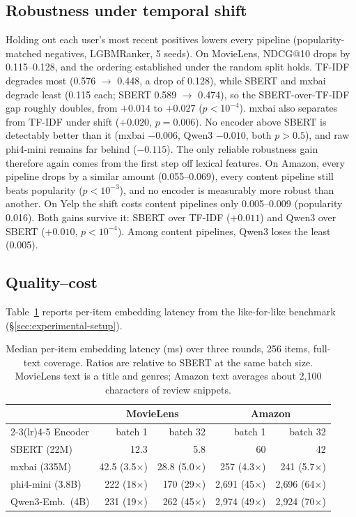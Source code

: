 \subsection{Robustness under temporal shift}
\label{sec:robustness}
\label{tab:robustness}
\label{fig:robustness}
Holding out each user's most recent positives lowers every pipeline
(popularity-matched negatives, LGBMRanker, 5 seeds). On MovieLens, NDCG@10
drops by 0.115--0.128, and the ordering established under the random
split holds. TF-IDF degrades most (0.576 $\rightarrow$ 0.448, a drop of 0.128),
while SBERT and mxbai degrade least (0.115 each; SBERT 0.589
$\rightarrow$ 0.474), so the SBERT-over-TF-IDF gap roughly doubles, from $+0.014$ to $+0.027$ ($p<10^{-4}$). mxbai also separates
from TF-IDF under shift ($+0.020$, $p=0.006$). No encoder above SBERT is
detectably better than it (mxbai $-0.006$, Qwen3 $-0.010$, both
$p>0.5$), and raw phi4-mini remains far behind ($-0.115$). The only
reliable robustness gain therefore again comes from the first step
off lexical features. On Amazon, every pipeline drops by a similar
amount (0.055--0.069), every content pipeline still beats popularity
($p<10^{-3}$), and no encoder is measurably more robust than another.
On Yelp the shift costs content pipelines only 0.005--0.009 (popularity
0.016). Both gains survive it: SBERT over TF-IDF ($+0.011$) and Qwen3
over SBERT ($+0.010$, $p<10^{-4}$). Among content pipelines, Qwen3 loses the least (0.005).

\subsection{Quality--cost}
\label{sec:quality-cost}

Table~\ref{tab:latency} reports per-item embedding latency from the
like-for-like benchmark (\S\ref{sec:experimental-setup}).

\begin{table}[t]
\centering
\caption{Median per-item embedding latency (ms) over three rounds, 256
items, full-text coverage. Ratios are relative to SBERT at the same
batch size. MovieLens text is a title and genres; Amazon text averages
about 2{,}100 characters of review snippets.}
\label{tab:latency}
\footnotesize
\setlength{\tabcolsep}{2pt}
\begin{tabular}{lrrrr}
\toprule
 & \multicolumn{2}{c}{MovieLens} & \multicolumn{2}{c}{Amazon} \\
\cmidrule(lr){2-3}\cmidrule(lr){4-5}
Encoder & batch 1 & batch 32 & batch 1 & batch 32 \\
\midrule
SBERT (22M) & 12.3 & 5.8 & 60 & 42 \\
mxbai (335M) & 42.5 (3.5$\times$) & 28.8 (5.0$\times$) & 257 (4.3$\times$) & 241 (5.7$\times$) \\
phi4-mini (3.8B) & 222 (18$\times$) & 170 (29$\times$) & 2{,}691 (45$\times$) & 2{,}696 (64$\times$) \\
Qwen3-Emb.\ (4B) & 231 (19$\times$) & 262 (45$\times$) & 2{,}974 (49$\times$) & 2{,}924 (70$\times$) \\
\bottomrule
\end{tabular}
\end{table}

